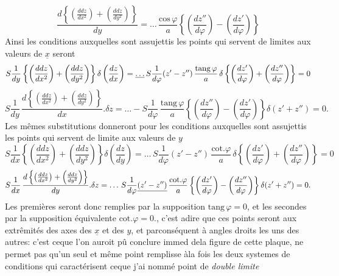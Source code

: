 \documentclass[11pt,a4paper]{article}
\begin{document}

\[ \frac{d\left\{\left(\frac{ddz}{dx^2}\right) + \left(\frac{ddz}{dy^2}\right)\right\}}{dy} = \ldots\,\frac{\text{cos}\,\varphi}{a}\left\{\left(\frac{dz''}{d\varphi}\right) - \left(\frac{dz'}{d\varphi}\right)\right\} \]
Ainsi les conditions auxquelles sont assujettis les points qui servent
de limites aux valeurs de $\underline{x}$ seront
\[ S\frac{1}{dy}\left\{\left(\frac{ddz}{dx^2}\right) + \left(\frac{ddz}{dy^2}\right)\right\}\delta\left(\frac{dz}{dx}\right) = \struck{\ldots}\,S\frac{1}{d\varphi}(z'-z'')\,\frac{\text{tang}\,\varphi}{a}\,\delta\left\{\left(\frac{dz'}{d\varphi}\right) + \left(\frac{dz''}{d\varphi}\right)\right\} = 0 \]
\[ S\frac{1}{dy}\,\frac{d\left\{\left(\frac{ddz}{dx^2}\right) + \left(\frac{ddz}{dy^2}\right)\right\}}{dx}.\delta z = \ldots - S\frac{1}{d\varphi}\,\frac{\text{tang}\,\varphi}{a}\left\{\left(\frac{dz''}{d\varphi}\right) - \left(\frac{dz'}{d\varphi}\right)\right\}\delta(z'+z'') = 0. \]
Les mêmes substitutions donneront pour les conditions auxquelles
sont assujettis les points qui servent de limite aux valeurs de $y$
\[ S\frac{1}{dx}\left\{\left(\frac{ddz}{dx^2}\right) + \left(\frac{ddz}{dy^2}\right)\right\}\delta\left(\frac{dz}{dy}\right) = \ldots\,S\frac{1}{d\varphi}(z'-z'')\,\frac{\text{cot}.\varphi}{a}\,\delta\left\{\left(\frac{dz'}{d\varphi}\right) + \left(\frac{dz''}{d\varphi}\right)\right\} = 0 \]
\[ S\frac{1}{dx}\,\frac{d\left\{\left(\frac{ddz}{dx^2}\right) + \left(\frac{ddz}{dy^2}\right)\right\}}{dy}.\delta z = \ldots\,S\frac{1}{d\varphi}\struck{(z'-z'')}\,\frac{\text{cot}.\varphi}{a}\left\{\left(\frac{dz'}{d\varphi}\right) - \left(\frac{dz''}{d\varphi}\right)\right\}\delta(z'+z'') = 0. \]
Les premières seront donc remplies par la supposition
$\text{tang}\,\varphi = 0$, et les secondes par la supposition équivalente
$\text{cot}.\varphi = 0$., c'est adire que ces points seront aux extrêmités
des axes des $\underline{x}$ et des $y$, et parconséquent à angles droits
les uns des autres: c'est ceque l'on auroit pû conclure immed
dela figure de cette plaque,  ne permet  pas
qu'un seul et même point remplisse àla fois les deux
systemes de conditions qui caractérisent ceque j'ai nommé
point de \emph{double limite}
\end{document}

